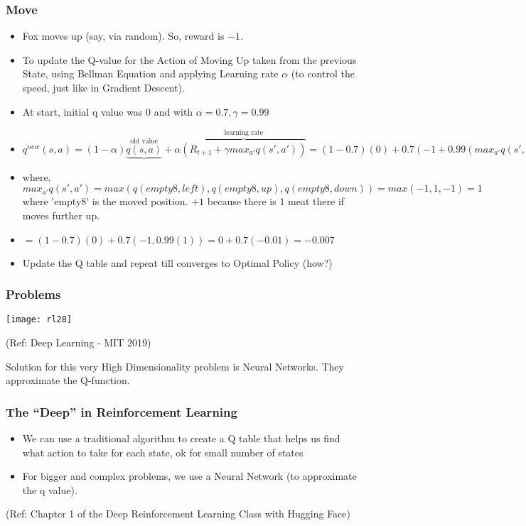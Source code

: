 \begin{frame}[fragile]\frametitle{Move}

\begin{itemize}
\item Fox moves up (say, via random). So, reward is $-1$. 
\item To update the Q-value for the Action of Moving Up taken from the previous State, using Bellman Equation and applying Learning rate $\alpha$ (to control the speed, just like in Gradient Descent).
\item At start, initial q value was 0 and with $\alpha = 0.7, \gamma = 0.99$

\item 

$q^{new}(s,a) = (1 - \alpha)\underbrace{q(s,a)}^\text{old value} + \alpha \overbrace{(R_{t+1} + \gamma max_{a'} q(s',a'))}^\text{learning rate} = (1-0.7)(0) + 0.7(-1 + 0.99(max_{a'} q(s',a')))$ 
\item where, $max_{a'} q(s',a') = max(q(empty8,left), q(empty8, up), q(empty8,down)) = max(-1,1,-1) = 1$ where 'empty8' is the moved position. $+1$ because there is 1 meat there if moves further up.
\item $= (1-0.7)(0) + 0.7(-1, 0.99(1)) = 0 + 0.7(-0.01) = -0.007$
\item Update the Q table and repeat till converges to Optimal Policy (how?)
\end{itemize}

\end{frame}

\begin{frame}[fragile]\frametitle{Problems}
\begin{center}
\texttt{[image: rl28]}
\end{center}

{\tiny (Ref: Deep Learning - MIT 2019)}

Solution for this very High Dimensionality problem is Neural Networks. They approximate the Q-function.

\end{frame}


\begin{frame}[fragile]\frametitle{The ``Deep'' in Reinforcement Learning}

\begin{itemize}
\item We can use a traditional algorithm to create a Q table that helps us find what action to take for each state, ok for small number of states
\item For bigger and complex problems, we use a Neural Network (to approximate the q value).
\end{itemize}


{\tiny (Ref: Chapter 1 of the Deep Reinforcement Learning Class with Hugging Face)}


\end{frame}

